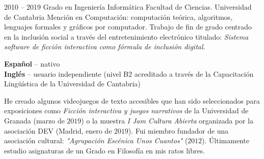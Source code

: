 \documentclass[9pt]{developercv} %
\begin{document}
%
%


\begin{entrylist}
	\entry
		{2010 -- 2019}
		{Grado en Ingeniería Informática}
		{Facultad de Ciencias. Universidad de Cantabria}
		{Mención en Computación: computación teórica, algoritmos, lenguajes formales y gráficos por computador. Trabajo de fin de grado centrado en la inclusión social a través del entretenimiento electrónico titulado: \emph{Sistema software de ficción interactiva como fórmula de inclusión digital}.}
\end{entrylist}

%
%

\begin{minipage}[t]{0.35\textwidth}
	\vspace{-\baselineskip} %

	
	\textbf{Español} -- nativo\\
	\textbf{Inglés} -- usuario independiente (nivel B2 acreditado a través de la Capacitación Lingüística de la Universidad de Cantabria)\\
\end{minipage}
\hfill
\begin{minipage}[t]{0.6\textwidth}
	\vspace{-\baselineskip} %
	

	He creado algunos videojuegos de texto accesibles que han sido seleccionados para exposiciones como \emph{Ficción interactiva y juegos narrativos} de la Universidad de Granada (marzo de $2019$) o la muestra \emph{I Jam Cultura Abierta} organizada por la asociación DEV (Madrid, enero de $2019$). Fui miembro fundador de una asociación cultural: \emph{"Agrupación Escénica Unos Cuantos"} ($2012$). Últimamente estudio asignaturas de un Grado en Filosofía en mis ratos libres.
\end{minipage}
\end{document}
